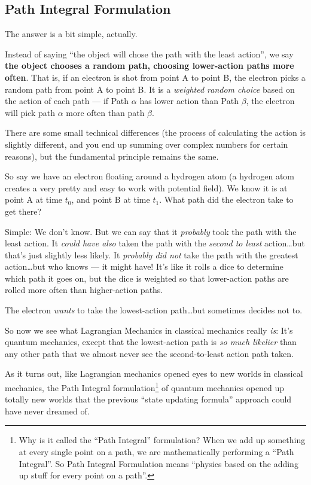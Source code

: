 \documentclass[]{article}
\begin{document}
\subsection{Path Integral Formulation}\label{path-integral-formulation}

The answer is a bit simple, actually.

Instead of saying ``the object will chose the path with the least action'', we
say \textbf{the object chooses a random path, choosing lower-action paths more
often}. That is, if an electron is shot from point A to point B, the electron
picks a random path from point A to point B. It is a \emph{weighted random
choice} based on the action of each path --- if Path \(\alpha\) has lower action
than Path \(\beta\), the electron will pick path \(\alpha\) more often than path
\(\beta\).

There are some small technical differences (the process of calculating the
action is slightly different, and you end up summing over complex numbers for
certain reasons), but the fundamental principle remains the same.

So say we have an electron floating around a hydrogen atom (a hydrogen atom
creates a very pretty and easy to work with potential field). We know it is at
point A at time \(t_0\), and point B at time \(t_1\). What path did the electron
take to get there?

Simple: We don't know. But we can say that it \emph{probably} took the path with
the least action. It \emph{could have also} taken the path with the \emph{second
to least} action\ldots but that's just slightly less likely. It \emph{probably
did not} take the path with the greatest action\ldots but who knows --- it might
have! It's like it rolls a dice to determine which path it goes on, but the dice
is weighted so that lower-action paths are rolled more often than higher-action
paths.

The electron \emph{wants} to take the lowest-action path\ldots but sometimes
decides not to.

So now we see what Lagrangian Mechanics in classical mechanics really \emph{is}:
It's quantum mechanics, except that the lowest-action path is \emph{so much
likelier} than any other path that we almost never see the second-to-least
action path taken.

As it turns out, like Lagrangian mechanics opened eyes to new worlds in
classical mechanics, the Path Integral formulation\footnote{Why is it called the
  ``Path Integral'' formulation? When we add up something at every single point
  on a path, we are mathematically performing a ``Path Integral''. So Path
  Integral Formulation means ``physics based on the adding up stuff for every
  point on a path''.} of quantum mechanics opened up totally new worlds that the
previous ``state updating formula'' approach could have never dreamed of.
\end{document}
